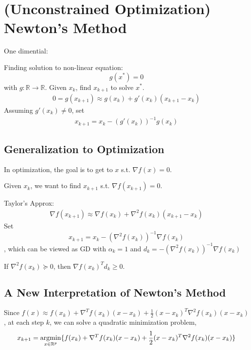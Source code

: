 \documentclass[11pt,a4paper]{article}
\newcommand{\argmin}{\operatornamewithlimits{argmin}}
\begin{document}
\section{(Unconstrained Optimization) Newton's Method}
One dimential:

Finding solution to non-linear equation:
$$g(x^*)=0$$ with $g:\mathbb{R} \rightarrow \mathbb{R}$. Given $x_k$, find $x_{k+1}$ to solve $x^*$.
\begin{equation}
    \begin{aligned}
        0=g(x_{k+1})\approx g(x_k)+g'(x_k)(x_{k+1}-x_k)
    \end{aligned}
    \nonumber
\end{equation}
Assuming $g'(x_k)\neq 0$, set
\begin{equation}
    \begin{aligned}
        x_{k+1}=x_k-(g'(x_k))^{-1}g(x_k)
    \end{aligned}
    \nonumber
\end{equation}

\subsection{Generalization to Optimization}
In optimization, the goal is to get to $x$ s.t. $\nabla f(x)=0$.

Given $x_k$, we want to find $x_{k+1}$ s.t. $\nabla f(x_{k+1})=0$.

Taylor's Approx: \begin{equation}
    \begin{aligned}
        \nabla f(x_{k+1})\approx \nabla f(x_k)+\nabla^2 f(x_k)(x_{k+1}-x_k)
    \end{aligned}
    \nonumber
\end{equation}
Set $$x_{k+1}=x_k-(\nabla^2 f(x_k))^{-1}\nabla f(x_k)$$, which can be viewed as GD with $\alpha_k=1$ and $d_k=-(\nabla^2 f(x_k))^{-1}\nabla f(x_k)$

If $\nabla^2 f(x_k)\succeq 0$, then $\nabla f(x_k)^Td_k\geq 0$.

\subsection{A New Interpretation of Newton’s Method}
Since $f(x)\approx f(x_k)+\nabla^T f(x_k)(x-x_k)+\frac{1}{2}(x-x_k)^T \nabla^2 f(x_k) (x-x_k)$, at each step $k$, we can solve a quadratic minimization problem,
\begin{equation}
    \begin{aligned}
        x_{k+1}=\argmin_{x\in \mathbb{R}^p}\{f(x_k)+\nabla^T f(x_k)(x-x_k)+\frac{1}{2}(x-x_k)^T \nabla^2 f(x_k) (x-x_k)\}
    \end{aligned}
    \nonumber
\end{equation}
\end{document}

